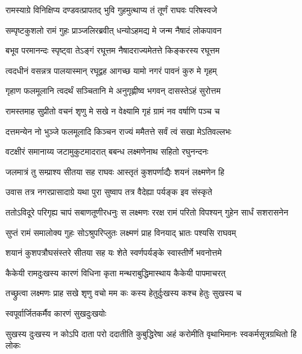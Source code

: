 \twolineshloka
{रामस्याग्रे विनिक्षिप्य दण्डवत्प्रापतद् भुवि}
{गुहमुत्थाप्य तं तूर्णं राघवः परिषस्वजे} %

\twolineshloka
{सम्पृष्टकुशलो रामं गुहः प्राञ्जलिरब्रवीत्}
{धन्योऽहमद्य मे जन्म नैषादं लोकपावन} %

\twolineshloka
{बभूव परमानन्दः स्पृष्ट्वा तेऽङ्गं रघूत्तम}
{नैषादराज्यमेतत्ते किङ्करस्य रघूत्तम} %

\twolineshloka
{त्वदधीनं वसन्नत्र पालयास्मान् रघूद्वह}
{आगच्छ यामो नगरं पावनं कुरु मे गृहम्} %

\twolineshloka
{गृहाण फलमूलानि त्वदर्थं सञ्चितानि मे}
{अनुगृह्णीष्व भगवन् दासस्तेऽहं सुरोत्तम} %

\twolineshloka
{रामस्तमाह सुप्रीतो वचनं शृणु मे सखे}
{न वेक्ष्यामि गृहं ग्रामं नव वर्षाणि पञ्च च} %

\twolineshloka
{दत्तमन्येन नो भुञ्जे फलमूलादि किञ्चन}
{राज्यं ममैतत्ते सर्वं त्वं सखा मेऽतिवल्लभः} %

\twolineshloka
{वटक्षीरं समानाय्य जटामुकुटमादरात्}
{बबन्ध लक्ष्मणेनाथ सहितो रघुनन्दनः} %

\twolineshloka
{जलमात्रं तु सम्प्राश्य सीतया सह राघवः}
{आस्तृतं कुशपर्णाद्यैः शयनं लक्ष्मणेन हि} %

\twolineshloka
{उवास तत्र नगरप्रासादाग्रे यथा पुरा}
{सुष्वाप तत्र वैदेह्या पर्यङ्क इव संस्कृते} %

\fourlineindentedshloka
{ततोऽविदूरे परिगृह्य चापं}
{सबाणतूणीरधनुः स लक्ष्मणः}
{ररक्ष रामं परितो विपश्यन्}
{गुहेन सार्धं सशरासनेन} %





\twolineshloka
{सुप्तं रामं समालोक्य गुहः सोऽश्रुपरिप्लुतः}
{लक्ष्मणं प्राह विनयाद् भ्रातः पश्यसि राघवम्} %

\twolineshloka
{शयानं कुशपत्रौघसंस्तरे सीतया सह}
{यः शेते स्वर्णपर्यङ्के स्वास्तीर्णे भवनोत्तमे} %

\twolineshloka
{कैकेयी रामदुःखस्य कारणं विधिना कृता}
{मन्थराबुद्धिमास्थाय कैकेयी पापमाचरत्} %

\twolineshloka
{तच्छ्रुत्वा लक्ष्मणः प्राह सखे शृणु वचो मम}
{कः कस्य हेतुर्दुःखस्य कश्च हेतुः सुखस्य च} %

\onelineshloka
{स्वपूर्वार्जितकर्मैव कारणं सुखदुःखयोः} %

\fourlineindentedshloka
{सुखस्य दुःखस्य न कोऽपि दाता}
{परो ददातीति कुबुद्धिरेषा}
{अहं करोमीति वृथाभिमानः}
{स्वकर्मसूत्रग्रथितो हि लोकः} %

